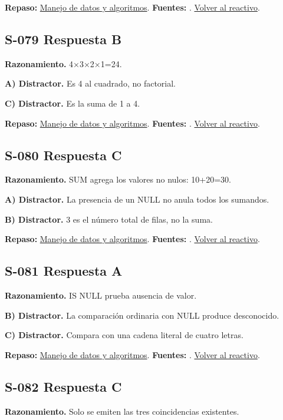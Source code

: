\textbf{Repaso:} \hyperref[sec:s3]{Manejo de datos y algoritmos}. \textbf{Fuentes:} \cite{algorithms,postgres,ai}. \hyperref[q:S-078]{Volver al reactivo}.\par\medskip

\subsection*{S-079 \quad Respuesta B}\label{s:S-079}
\textbf{Razonamiento.} 4×3×2×1=24.

\textbf{A) Distractor. }Es 4 al cuadrado, no factorial.

\textbf{C) Distractor. }Es la suma de 1 a 4.

\textbf{Repaso:} \hyperref[sec:s3]{Manejo de datos y algoritmos}. \textbf{Fuentes:} \cite{algorithms,postgres,ai}. \hyperref[q:S-079]{Volver al reactivo}.\par\medskip

\subsection*{S-080 \quad Respuesta C}\label{s:S-080}
\textbf{Razonamiento.} SUM agrega los valores no nulos: 10+20=30.

\textbf{A) Distractor. }La presencia de un NULL no anula todos los sumandos.

\textbf{B) Distractor. }3 es el número total de filas, no la suma.

\textbf{Repaso:} \hyperref[sec:s3]{Manejo de datos y algoritmos}. \textbf{Fuentes:} \cite{postgres}. \hyperref[q:S-080]{Volver al reactivo}.\par\medskip

\subsection*{S-081 \quad Respuesta A}\label{s:S-081}
\textbf{Razonamiento.} IS NULL prueba ausencia de valor.

\textbf{B) Distractor. }La comparación ordinaria con NULL produce desconocido.

\textbf{C) Distractor. }Compara con una cadena literal de cuatro letras.

\textbf{Repaso:} \hyperref[sec:s3]{Manejo de datos y algoritmos}. \textbf{Fuentes:} \cite{postgres}. \hyperref[q:S-081]{Volver al reactivo}.\par\medskip

\subsection*{S-082 \quad Respuesta C}\label{s:S-082}
\textbf{Razonamiento.} Solo se emiten las tres coincidencias existentes.

